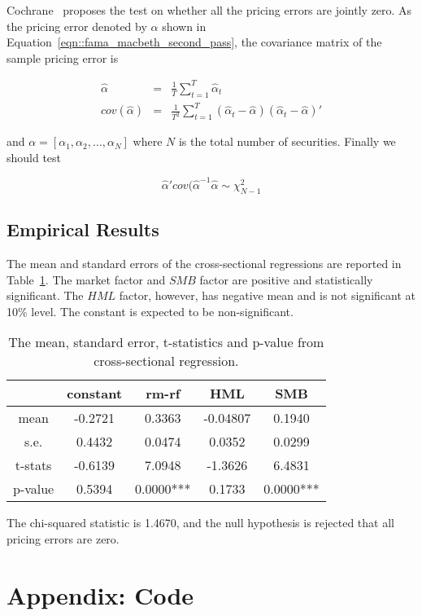 \documentclass[11pt,reqno,final]{amsart}
\begin{document}
Cochrane~\cite{J09} proposes the test on whether all the pricing errors are jointly zero. As the pricing error denoted by $\alpha$ shown in Equation~\ref{eqn::fama_macbeth_second_pass}, the covariance matrix of the sample pricing error is

\begin{eqnarray*}
\hat{\alpha} &=& \frac{1}{T} \sum_{t=1}^{T} \hat{\alpha}_t \\
cov(\hat{\alpha}) &=& \frac{1}{T^2} \sum_{t=1}^{T} (\hat{\alpha}_t - \hat{\alpha})(\hat{\alpha}_t - \hat{\alpha})'
\end{eqnarray*} 

and $\alpha = [\alpha_1, \alpha_2, \ldots, \alpha_N]$ where $N$ is the total number of securities. Finally we should test

$$
\hat{\alpha}' cov(\hat{\alpha}^{-1} \hat{\alpha} \sim \chi^2_{N-1}
$$

\subsection{Empirical Results}
The mean and standard errors of the cross-sectional regressions are reported in Table~\ref{tbl::coeff}. The market factor and $SMB$ factor are positive and statistically significant. The $HML$ factor, however, has negative mean and is not significant at 10\% level. The constant is expected to be non-significant.  

\begin{table}
\begin{center}
\caption{The mean, standard error, t-statistics and p-value from cross-sectional regression.}
\begin{tabular}{c|cccc} 
  \hline
	&	constant	&	rm-rf	&	HML	&	SMB	\\ \hline
mean	&	-0.2721	&	0.3363	&	-0.04807	&	0.1940	\\  
s.e.	&	0.4432	&	0.0474	&	0.0352	&	0.0299	\\
t-stats	&	-0.6139	&	7.0948	&	-1.3626	&	6.4831	\\
p-value	&	0.5394	&	0.0000***	&	0.1733	&	0.0000***	\\
  \hline
\end{tabular}\label{tbl::coeff}
\end{center}
\end{table}

The chi-squared statistic is 1.4670, and the null hypothesis is rejected that all pricing errors are zero. 

%
%


%
%
\newpage
\section*{Appendix: Code}

\end{document}
